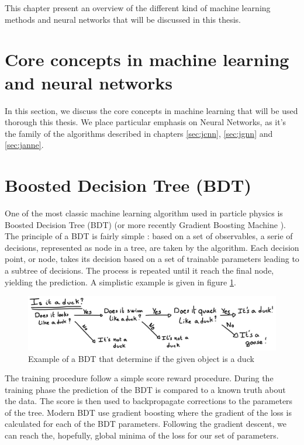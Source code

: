 \documentclass[../main.tex]{subfiles}
\begin{document}
This chapter present an overview of the different kind of machine learning methods and neural networks that will be discussed in this thesis.

\section{Core concepts in machine learning and neural networks}

In this section, we discuss the core concepts in machine learning that will be used thorough this thesis. We place particular emphasis on Neural Networks, as it's the family of the algorithms described in chapters \ref{sec:jcnn}, \ref{sec:jgnn} and \ref{sec:janne}.

\section{Boosted Decision Tree (BDT)}
\label{sec:ml:bdt}

One of the most classic machine learning algorithm used in particle physics is Boosted Decision Tree (BDT) \cite{breiman_classification_2017} (or more recently Gradient Boosting Machine \cite{friedman_greedy_2001}). The principle of a BDT is fairly simple : based on a set of observables, a serie of decisions, represented as node in a tree, are taken by the algorithm. Each decision point, or node, takes its decision based on a set of trainable parameters leading to a subtree of decisions. The process is repeated until it reach the final node, yielding the prediction. A simplistic example is given in figure \ref{fig:ml:bdt}.

\begin{figure}
  \centering
  \includegraphics[width=\linewidth]{images/ml/Bdt.jpg}
  \caption{Example of a BDT that determine if the given object is a duck}
  \label{fig:ml:bdt}
\end{figure}

The training procedure follow a simple score reward procedure. During the training phase the prediction of the BDT is compared to a known truth about the data. The score is then used to backpropagate corrections to the parameters of the tree. Modern BDT use gradient boosting where the gradient of the loss is calculated for each of the BDT parameters. Following the gradient descent, we can reach the, hopefully, global minima of the loss for our set of parameters.
\end{document}
